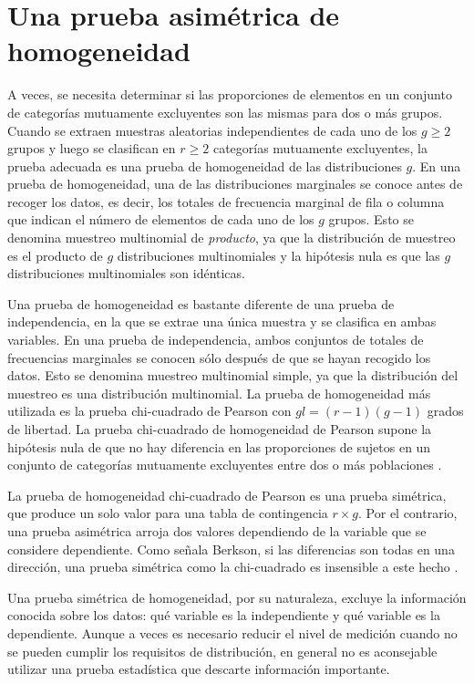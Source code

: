 \documentclass[12pt,a4paper,]{book}
\numberwithin{dummy}{section}
\theoremstyle{ocrenumbox}
\theoremstyle{blacknumex}
\theoremstyle{blacknumbox}
\theoremstyle{ocrenum}
\theoremstyle{ocrenum}
\begin{document}
\hypertarget{una-prueba-asimuxe9trica-de-homogeneidad}{%
\section{Una prueba asimétrica de
homogeneidad}\label{una-prueba-asimuxe9trica-de-homogeneidad}}

A veces, se necesita determinar si las proporciones de elementos en un
conjunto de categorías mutuamente excluyentes son las mismas para dos o
más grupos. Cuando se extraen muestras aleatorias independientes de cada
uno de los \(g \ge 2\) grupos y luego se clasifican en \(r \ge 2\)
categorías mutuamente excluyentes, la prueba adecuada es una prueba de
homogeneidad de las distribuciones \(g\). En una prueba de homogeneidad,
una de las distribuciones marginales se conoce antes de recoger los
datos, es decir, los totales de frecuencia marginal de fila o columna
que indican el número de elementos de cada uno de los \(g\) grupos. Esto
se denomina muestreo multinomial de \emph{producto}, ya que la
distribución de muestreo es el producto de \(g\) distribuciones
multinomiales y la hipótesis nula es que las \(g\) distribuciones
multinomiales son idénticas.

Una prueba de homogeneidad es bastante diferente de una prueba de
independencia, en la que se extrae una única muestra y se clasifica en
ambas variables. En una prueba de independencia, ambos conjuntos de
totales de frecuencias marginales se conocen sólo después de que se
hayan recogido los datos. Esto se denomina muestreo multinomial simple,
ya que la distribución del muestreo es una distribución
multinomial\citep{Bohning1989}. La prueba de homogeneidad más utilizada
es la prueba chi-cuadrado de Pearson con \(gl = (r - 1)(g - 1)\) grados
de libertad. La prueba chi-cuadrado de homogeneidad de Pearson supone la
hipótesis nula de que no hay diferencia en las proporciones de sujetos
en un conjunto de categorías mutuamente excluyentes entre dos o más
poblaciones \citep{Marascuilo1977}.

La prueba de homogeneidad chi-cuadrado de Pearson es una prueba
simétrica, que produce un solo valor para una tabla de contingencia
\(r\times g\). Por el contrario, una prueba asimétrica arroja dos
valores dependiendo de la variable que se considere dependiente. Como
señala Berkson, si las diferencias son todas en una dirección, una
prueba simétrica como la chi-cuadrado es insensible a este hecho
\citep{Berkson1938}.

Una prueba simétrica de homogeneidad, por su naturaleza, excluye la
información conocida sobre los datos: qué variable es la independiente y
qué variable es la dependiente. Aunque a veces es necesario reducir el
nivel de medición cuando no se pueden cumplir los requisitos de
distribución, en general no es aconsejable utilizar una prueba
estadística que descarte información importante.
\end{document}
